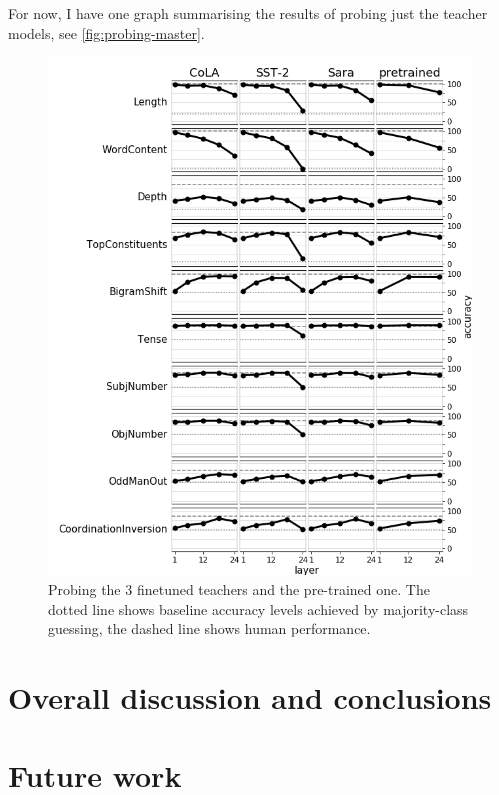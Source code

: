\documentclass[bsc,frontabs,twoside,singlespacing,parskip,deptreport]{infthesis}
\begin{document}
{{    For now, I have one graph summarising the results of probing just the teacher models, see \autoref{fig:probing-master}.
    \begin{figure}[h!t]
      \centering
      \includegraphics[width=12.5cm]{graphics/probing_master.png}
      \caption{Probing the 3 finetuned teachers and the pre-trained one. The dotted line shows baseline accuracy levels achieved by majority-class guessing, the dashed line shows human performance.}
      \label{fig:probing-master}
    \end{figure}
  }
}

\chapter{Overall discussion and conclusions}{
  
}

\chapter{Future work}{
  
}




\appendix
\end{document}
